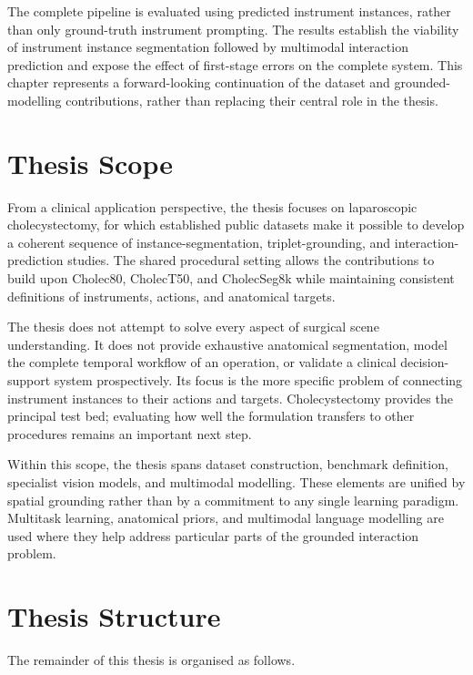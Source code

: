 The complete pipeline is evaluated using predicted instrument instances, rather than only ground-truth instrument prompting. The results establish the viability of instrument instance segmentation followed by multimodal interaction prediction and expose the effect of first-stage errors on the complete system. This chapter represents a forward-looking continuation of the dataset and grounded-modelling contributions, rather than replacing their central role in the thesis.

\section{Thesis Scope}
\label{sec:introduction-scope}

From a clinical application perspective, the thesis focuses on laparoscopic cholecystectomy, for which established public datasets make it possible to develop a coherent sequence of instance-segmentation, triplet-grounding, and interaction-prediction studies. The shared procedural setting allows the contributions to build upon Cholec80, CholecT50, and CholecSeg8k while maintaining consistent definitions of instruments, actions, and anatomical targets.

The thesis does not attempt to solve every aspect of surgical scene understanding. It does not provide exhaustive anatomical segmentation, model the complete temporal workflow of an operation, or validate a clinical decision-support system prospectively. Its focus is the more specific problem of connecting instrument instances to their actions and targets. Cholecystectomy provides the principal test bed; evaluating how well the formulation transfers to other procedures remains an important next step.

Within this scope, the thesis spans dataset construction, benchmark definition, specialist vision models, and multimodal modelling. These elements are unified by spatial grounding rather than by a commitment to any single learning paradigm. Multitask learning, anatomical priors, and multimodal language modelling are used where they help address particular parts of the grounded interaction problem.

\section{Thesis Structure}
\label{sec:introduction-structure}

The remainder of this thesis is organised as follows.

